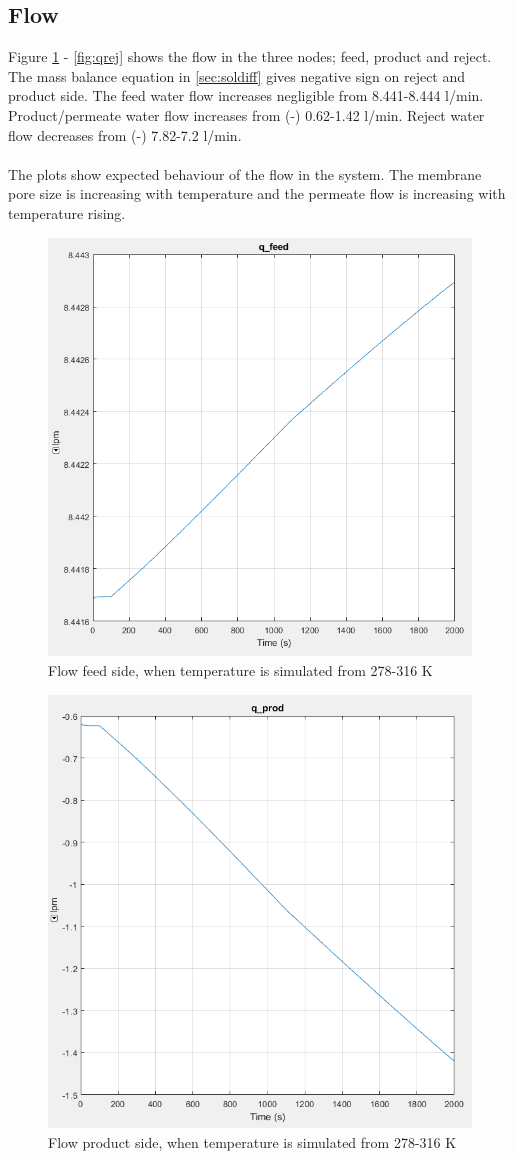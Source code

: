 \subsection{Flow}
Figure \ref{fig:qf} - \ref{fig:qrej} shows the flow in the three nodes; feed, product and reject. The mass balance equation in \ref{sec:soldiff} gives negative sign on reject and product side. The feed water flow increases negligible from 8.441-8.444 l/min. Product/permeate water flow increases from (-) 0.62-1.42 l/min. Reject water flow decreases from (-) 7.82-7.2 l/min. \\
\\
The plots show expected behaviour of the flow in the system. The membrane pore size is increasing with temperature and the permeate flow is increasing with temperature rising.
\begin{figure}[h]
  \centering
  \includegraphics[width=0.7\linewidth]{q_feed.PNG}
  \caption{Flow feed side, when temperature is simulated from 278-316 K}
  \label{fig:qf}
\end{figure}
\begin{figure}[h]
  \centering
  \includegraphics[width=0.7\linewidth]{q_prod.PNG}
  \caption{Flow product side, when temperature is simulated from 278-316 K}
  \label{fig:qp}
\end{figure}
